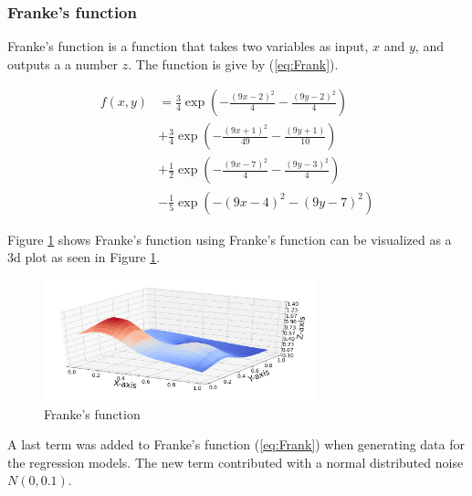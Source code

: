 \documentclass[twocolumn]{cinc}
\begin{document}
\subsubsection{Franke's function}
Franke’s function is a function that takes two variables as input, $x$ and $y$, and outputs a a number $z$. The function is give by (\ref{eq:Frank}).

\begin{align*}
\tag{Eq 1}
\label{eq:Frank}
f(x,y) &= \frac{3}{4}\exp{\left(-\frac{(9x-2)^2}{4} - \frac{(9y-2)^2}{4}\right)} \\ &+\frac{3}{4}\exp{\left(-\frac{(9x+1)^2}{49}- \frac{(9y+1)}{10}\right)}\\ 
&+\frac{1}{2}\exp{\left(-\frac{(9x-7)^2}{4} - \frac{(9y-3)^2}{4}\right)}\\ 
&-\frac{1}{5}\exp{\left(-(9x-4)^2 - (9y-7)^2\right) }
\end{align*}

Figure \ref{fig:Frankplt} shows Franke's function using 
Franke's function can be visualized as a 3d plot as seen in Figure \ref{fig:Frankplt}.

\begin{figure}[h]
\includegraphics[width=7.9cm]{Figures/Franke_func.png}
\caption{Franke's function}
\label{fig:Frankplt}
\end{figure}

A last term  was added to Franke’s function (\ref{eq:Frank}) when generating data for the regression models. The new term contributed with a normal distributed noise $N(0,0.1)$.  
\end{document}
